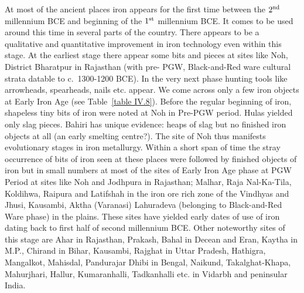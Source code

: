 At most of the ancient places iron appears for the first time between the $2^{\rm nd}$ millennium BCE and beginning of the $1^{\rm st}$ millennium BCE. It comes to be used around this time in several parts of the country. There appears to be a qualitative and quantitative improvement in iron technology even within this stage. At the earliest stage there appear some bits and pieces at sites like Noh, District Bharatpur in Rajasthan (with pre- PGW, Black-and-Red ware cultural strata datable to c.~1300-1200 BCE). In the very next phase hunting tools like arrowheads, spearheads, nails etc. appear. We come across only a few iron objects at Early Iron Age (see Table~\ref{table IV.8}). Before the regular beginning of iron, shapeless tiny bits of iron were noted at Noh in Pre-PGW period. Hulas yielded only slag pieces. Bahiri has unique evidence: heaps of slag but no finished iron objects at all (an early smelting centre?). The site of Noh thus manifests evolutionary stages in iron metallurgy. Within a short span of time the stray occurrence of bits of iron seen at these places were followed by finished objects of iron but in small numbers at most of the sites of Early Iron Age phase at PGW Period at sites like Noh and Jodhpura in Rajasthan; Malhar, Raja Nal-Ka-Tila, Koldihwa, Raipura and Latifshah in the iron ore rich zone of the Vindhyas and Jhusi, Kausambi, Aktha (Varanasi) Lahuradeva (belonging to Black-and-Red Ware phase) in the plains. These sites have yielded early dates of use of iron dating back to first half of second millennium BCE. Other noteworthy sites of this stage are Ahar in Rajasthan, Prakash, Bahal in Decean and Eran, Kaytha in M.P., Chirand in Bihar, Kausambi, Rajghat in Uttar Pradesh, Hathigra, Mangalkot, Mahisdal, Pandurajar Dhibi in Bengal, Naikund, Takalghat-Khapa, Mahurjhari, Hallur, Kumaranhalli, Tadkanhalli etc. in Vidarbh and peninsular India. 

